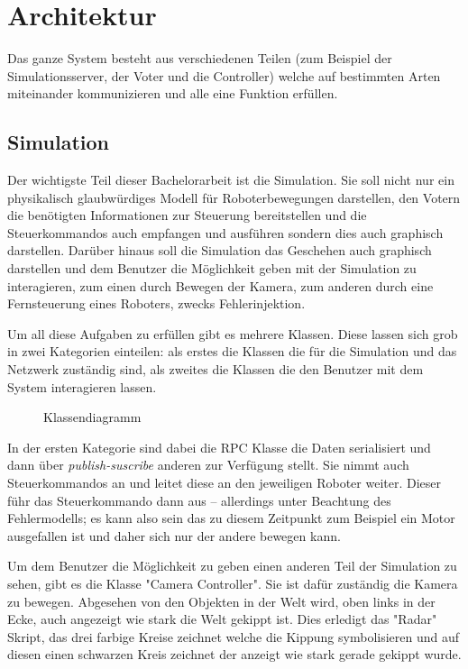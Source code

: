 \clearpage
\section{Architektur}
Das ganze System besteht aus verschiedenen Teilen (zum Beispiel der Simulationsserver, der Voter und die Controller) welche
auf bestimmten Arten miteinander kommunizieren und alle eine Funktion erf{\"{u}}llen.

\subsection{Simulation}
Der wichtigste Teil dieser Bachelorarbeit ist die Simulation. Sie soll nicht nur ein physikalisch glaubw{\"{u}}rdiges Modell
f{\"{u}}r Roboterbewegungen darstellen, den Votern die ben{\"{o}}tigten Informationen zur Steuerung bereitstellen und die
Steuerkommandos auch empfangen und ausf{\"{u}}hren sondern dies auch graphisch darstellen. Dar{\"{u}}ber hinaus soll die
Simulation das Geschehen auch graphisch darstellen und dem Benutzer die M{\"{o}}glichkeit geben mit der Simulation zu
interagieren, zum einen durch Bewegen der Kamera, zum anderen durch eine Fernsteuerung eines Roboters, zwecks Fehlerinjektion.

Um all diese Aufgaben zu erf{\"{u}}llen gibt es mehrere Klassen. Diese lassen sich grob in zwei Kategorien einteilen: als
erstes die Klassen die f{\"{u}}r die Simulation und das Netzwerk zust{\"{a}}ndig sind, als zweites die Klassen die den Benutzer
mit dem System interagieren lassen.
\begin{figure}
	\centering
	\caption{Klassendiagramm}
	\label{fig:arch}
\end{figure}

In der ersten Kategorie sind dabei die RPC Klasse die Daten serialisiert und dann {\"{u}}ber \textit{publish-suscribe} anderen
zur Verf{\"{u}}gung stellt. Sie nimmt auch Steuerkommandos an und leitet diese an den jeweiligen Roboter weiter. Dieser f{\"{u}}hr
das Steuerkommando dann aus -- allerdings unter Beachtung des Fehlermodells; es kann also sein das zu diesem Zeitpunkt zum
Beispiel ein Motor ausgefallen ist und daher sich nur der andere bewegen kann.

Um dem Benutzer die M{\"{o}}glichkeit zu geben einen anderen Teil der Simulation zu sehen, gibt es die Klasse "Camera Controller".
Sie ist daf{\"{u}}r zust{\"{a}}ndig die Kamera zu bewegen. Abgesehen von den Objekten in der Welt wird, oben links in der Ecke,
auch angezeigt wie stark die Welt gekippt ist. Dies erledigt das "Radar" Skript, das drei farbige Kreise zeichnet welche die
Kippung symbolisieren und auf diesen einen schwarzen Kreis zeichnet der anzeigt wie stark gerade gekippt wurde.

